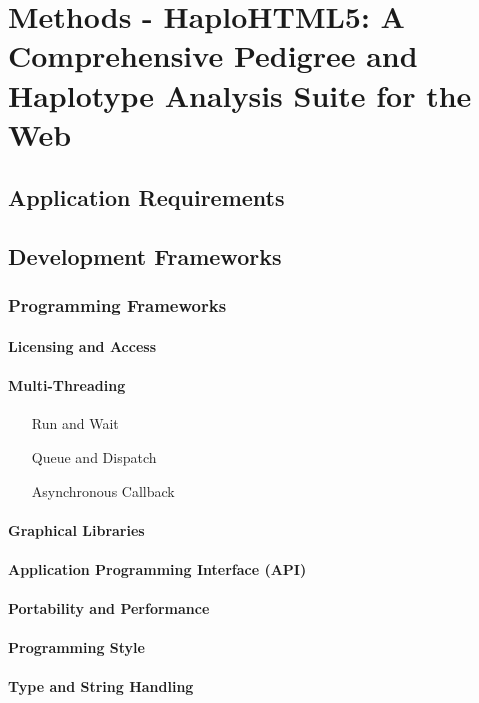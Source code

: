 \chapter{Methods - HaploHTML5: A Comprehensive Pedigree and Haplotype Analysis Suite for the Web}

\section{Application Requirements}

\section{Development Frameworks}
\subsection{Programming Frameworks}
\subsubsection{Licensing and Access}
\subsubsection{Multi-Threading}
\begin{enumerate}
\item[Run and Wait]{}
\item[Queue and Dispatch]{}
\item[Asynchronous Callback]{}
\end{enumerate}

\subsubsection{Graphical Libraries}
\subsubsection{Application Programming Interface (API)}
\subsubsection{Portability and Performance}
\subsubsection{Programming Style}
\subsubsection{Type and String Handling}
